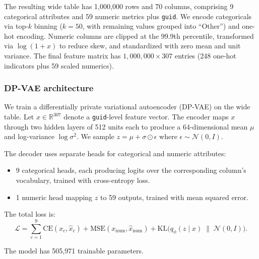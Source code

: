 \documentclass[12pt,letterpaper]{article}
\renewcommand{\_}{\textunderscore\allowbreak}
\begin{document}
The resulting wide table has 1{,}000{,}000 rows and 70 columns, comprising 9 categorical attributes and 59 numeric metrics plus \texttt{guid}. We encode categoricals via top-$k$ binning ($k = 50$, with remaining values grouped into ``Other'') and one-hot encoding. Numeric columns are clipped at the 99.9th percentile, transformed via $\log(1 + x)$ to reduce skew, and standardized with zero mean and unit variance. The final feature matrix has $1{,}000{,}000 \times 307$ entries (248 one-hot indicators plus 59 scaled numerics).

\subsubsection{DP-VAE architecture}

We train a differentially private variational autoencoder (DP-VAE) on the wide table. Let $x \in \mathbb{R}^{307}$ denote a \texttt{guid}-level feature vector. The encoder maps $x$ through two hidden layers of 512 units each to produce a 64-dimensional mean $\mu$ and log-variance $\log \sigma^2$. We sample $z = \mu + \sigma \odot \epsilon$ where $\epsilon \sim \mathcal{N}(0, I)$.

The decoder uses separate heads for categorical and numeric attributes:
\begin{itemize}
    \item 9 categorical heads, each producing logits over the corresponding column's vocabulary, trained with cross-entropy loss.
    \item 1 numeric head mapping $z$ to 59 outputs, trained with mean squared error.
\end{itemize}

The total loss is:
\begin{equation}
    \mathcal{L} = \sum_{c=1}^{9} \text{CE}(x_c, \hat{x}_c) + \text{MSE}(x_{\text{num}}, \hat{x}_{\text{num}}) + \text{KL}\bigl(q_\phi(z \mid x) \;\|\; \mathcal{N}(0, I)\bigr).
\end{equation}

The model has 505{,}971 trainable parameters.
\end{document}
